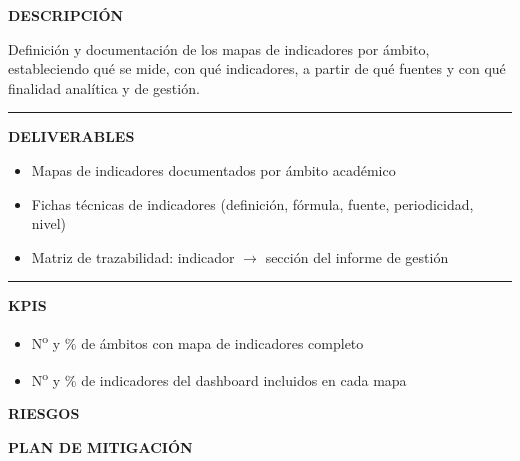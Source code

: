 \documentclass[11pt,a4paper]{scrreprt}
\newcommand{\fieldlabel}[1]{%
  {\footnotesize\sffamily\bfseries\color{mutedcolor}\MakeUppercase{#1}}\par\nopagebreak[4]
}
\newcommand{\fieldsep}{\vspace{3pt}\noindent\textcolor{bordercolor}{\rule{\linewidth}{0.4pt}}\vspace{3pt}\par}
\begin{document}
\begin{tcolorbox}[pabox={dashcolor}{PA2.1 \enspace\textbullet\enspace Definición y elaboración de los mapas de indicadores por ámbitos académicos}]

\fieldlabel{Descripci\'on}
{\small Definición y documentación de los mapas de indicadores por ámbito, estableciendo qué se mide, con qué indicadores, a partir de qué fuentes y con qué finalidad analítica y de gestión.}\par
\fieldsep
\fieldlabel{Deliverables}
{\small \begin{itemize}[noitemsep,topsep=2pt]
\item Mapas de indicadores documentados por ámbito académico
\item Fichas técnicas de indicadores (definición, fórmula, fuente, periodicidad, nivel)
\item Matriz de trazabilidad: indicador $\rightarrow$ sección del informe de gestión
\end{itemize}}\par
\fieldsep
\fieldlabel{KPIs}
{\small \begin{itemize}[noitemsep,topsep=2pt]
\item N\textsuperscript{o} y \% de ámbitos con mapa de indicadores completo
\item N\textsuperscript{o} y \% de indicadores del dashboard incluidos en cada mapa
\end{itemize}}\par
\end{tcolorbox}
\begin{tcolorbox}[riskbox]
{\footnotesize\sffamily\bfseries\color{red!50!black} RIESGOS}\par{}
\end{tcolorbox}
\begin{tcolorbox}[mitbox]
{\footnotesize\sffamily\bfseries\color{green!40!black} PLAN DE MITIGACI\'ON}\par{}
\end{tcolorbox}
\vspace{8pt}
\end{document}
